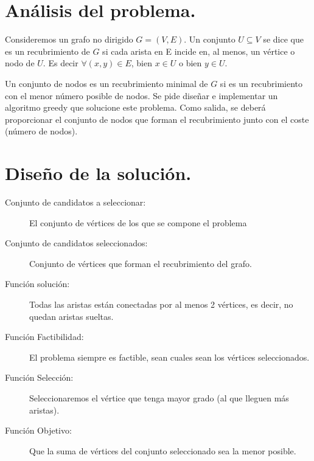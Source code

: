 \documentclass[a4paper, 11pt]{article}
\begin{document}

\renewcommand{\abstractname}{Resumen} %


\color{darkGray}
{\parskip=2pt
  \tableofcontents
}

\section{Análisis del problema.}
 Consideremos un grafo no dirigido $G = (V, E)$. Un conjunto $U \subseteq V$ se dice que es un recubrimiento de $G$ si cada arista en E incide en, al menos, un vértice o nodo de $U$. Es decir $\forall(x, y) \in E$, bien $x \in U$ o bien $ y \in U$. 

Un conjunto de nodos es un recubrimiento minimal de $G$ si es un recubrimiento con el menor número posible de nodos. Se pide diseñar e implementar un algoritmo greedy que solucione este problema. Como salida, se deberá proporcionar el conjunto de nodos que forman el recubrimiento junto con el coste (número de nodos).

\section{Diseño de la solución.}

\begin{description}
\item [Conjunto de candidatos a seleccionar:] El conjunto de vértices de los que se compone el problema

\item [Conjunto de candidatos seleccionados:] Conjunto de vértices que forman el recubrimiento del grafo.

\item [Función solución:] Todas las aristas están conectadas por al menos 2 vértices, es decir, no quedan aristas sueltas.

\item [Función Factibilidad:] El problema siempre es factible, sean cuales sean los vértices seleccionados.

\item [Función Selección:] Seleccionaremos el vértice que tenga mayor grado (al que lleguen más aristas).

\item [Función Objetivo:] Que la suma de vértices del conjunto seleccionado sea la menor posible.
\end{description}
\end{document}
